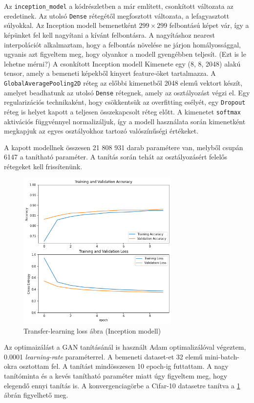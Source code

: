 Az \texttt{inception\_model} a kódrészletben a már említett, csonkított változata az eredetinek. Az utolsó \texttt{Dense} rétegétől megfosztott változata, a lefagyasztott súlyokkal. Az Inception modell bemenetként $299 \times 299$ felbontású képet vár, így a képünket fel kell nagyítani a kívánt felbontásra. A nagyításhoz nearest interpolációt alkalmaztam, hogy a felbontás növelése ne járjon homályossággal, ugyanis azt figyeltem meg, hogy olyankor a modell gyengébben teljesít. (Ezt is le lehetne mérni?)
A csonkított Inception modell Kimenete egy (8, 8, 2048) alakú tensor, amely a bemeneti képekből kinyert feature-öket tartalmazza. A \texttt{GlobalAveragePooling2D} réteg az előbbi kimenetből 2048 elemű vektort készít, amelyet beadhatunk az utolsó \texttt{Dense} rétegnek, amely az osztályozást végzi el. Egy regularizációs technikaként, hogy csökkentsük az overfitting esélyét, egy \texttt{Dropout} réteg is helyet kapott a teljesen összekapcsolt réteg előtt.
A kimenetet \texttt{softmax} aktivációs függvénnyel normalizáljuk, így a modell használata során kimenetként megkapjuk az egyes osztályokhoz tartozó valószínűségi értékeket.

A kapott modellnek összesen 21 808 931 darab paramétere van, melyből csupán 6147 a tanítható paraméter. A tanítás során tehát az osztályozásért felelős rétegeket kell frissítenünk.

\begin{figure}[h]
	\centering
	\includegraphics[width=8cm]{images/transfer_inception.png}
	\caption{Transfer-learning loss ábra (Inception modell)}
	\label{fig:transfer_learning_loss}
\end{figure}

Az optimaizálást a GAN tanításánál is használt Adam optimalizálóval végeztem, 0.0001 \textit{learning-rate} paraméterrel. A bemeneti dataset-et 32 elemű mini-batch-okra osztottam fel. A tanítást mindösszesen 10 epoch-ig futtattam. A nagy tanítóminta és a kevés tanítható paraméter miatt úgy figyeltem meg, hogy elegendő ennyi tanítás is. A konvergenciagörbe a Cifar-10 datasetre tanítva a \ref{fig:transfer_learning_loss} ábrán figyelhető meg.

